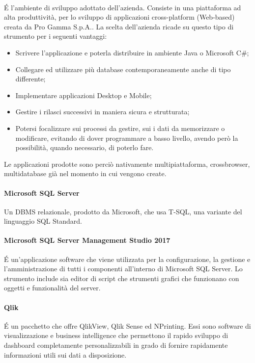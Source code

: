 \paragraph{\inde} \'E l'ambiente di sviluppo adottato dell'azienda. Consiste in una piattaforma ad alta produttività, per lo sviluppo di applicazioni cross-platform (Web-based) creata da Pro Gamma S.p.A.. La scelta dell'azienda ricade su questo tipo di strumento per i seguenti vantaggi:
\begin{itemize}
	\item Scrivere l'applicazione e poterla distribuire in ambiente Java o Microsoft C\#;
	\item Collegare ed utilizzare più database contemporaneamente anche di tipo differente;
	\item Implementare applicazioni Desktop e Mobile;
	\item Gestire i rilasci successivi in maniera sicura e strutturata;
	\item Potersi focalizzare sui processi da gestire, sui i dati da memorizzare o modificare, evitando di dover programmare a basso livello, avendo però la possibilità, quando necessario, di poterlo fare.
\end{itemize}
Le applicazioni prodotte sono perciò nativamente multipiattaforma, crossbrowser, multidatabase già nel momento in cui vengono create.

\paragraph{Microsoft SQL Server} Un DBMS relazionale, prodotto da Microsoft, che usa T-SQL, una variante del linguaggio SQL Standard. 

\paragraph{Microsoft SQL Server Management Studio 2017} \'E un'applicazione software che viene utilizzata per la configurazione, la gestione e l'amministrazione di tutti i componenti all'interno di Microsoft SQL Server. Lo strumento include sia editor di script che strumenti grafici che funzionano con oggetti e funzionalità del server.

\paragraph{Qlik}\'E un pacchetto che offre QlikView, Qlik Sense ed NPrinting. Essi sono software di visualizzazione e business intelligence che permettono il rapido sviluppo di dashboard completamente personalizzabili in grado di fornire rapidamente informazioni utili sui dati a disposizione.

